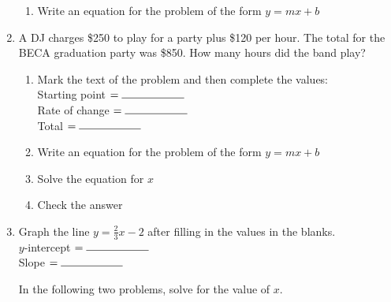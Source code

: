 \documentclass[12pt, oneside]{article}
\begin{document}
\begin{enumerate}
\begin{enumerate}
    \item Write an equation for the problem of the form $y=mx+b$\\[1.5cm]

  \end{enumerate}

  \item A DJ charges \$250 to play for a party plus \$120 per hour. The total for the BECA graduation party was \$850. How many hours did the band play?
  \begin{enumerate}
    \item Mark the text of the problem and then complete the values:\\[0.5cm]
    Starting point $= \rule{2cm}{0.15mm}$ \\[0.5cm]
    Rate of change $= \rule{2cm}{0.15mm}$ \\[0.5cm]
    Total $= \rule{2cm}{0.15mm}$ \\

    \item Write an equation for the problem of the form $y=mx+b$\\[1.5cm]
    \item Solve the equation for $x$ \vspace{3.5cm}
    \item Check the answer \vspace{2.5cm}
  \end{enumerate}

\newpage
\item Graph the line $y=\frac{2}{3} x -2$ after filling in the values in the blanks.\\[0.85cm]
      $y$-intercept $= \rule{2cm}{0.15mm}$ \\[0.5cm]
      Slope $= \rule{2cm}{0.15mm}$

\begin{center} %
\end{center}

In the following two problems, solve for the value of $x$.



\end{enumerate}
\end{document}
